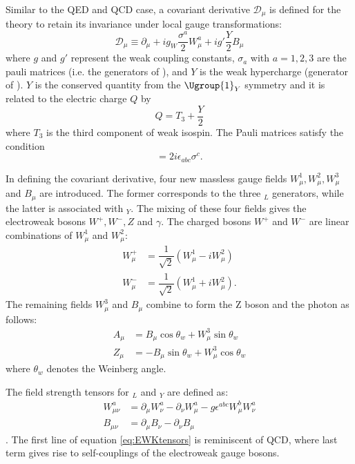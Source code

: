 Similar to the QED and QCD case, a covariant derivative $\mathcal{D}_{\mu}$ is defined for the theory to retain its invariance under local gauge transformations:
\begin{equation}
    \mathcal{D}_{\mu}\equiv \partial_{\mu}+ig_W\dfrac{\sigma^a}{2}W^a_{\mu}+ig'\dfrac{Y}{2}B_{\mu}
\end{equation}
where $g$ and $g'$ represent the weak coupling constants, $\sigma_a$ with $a=1,2,3$ are the pauli matrices (i.e. the generators of ), and $Y$ is the weak hypercharge (generator of ). $Y$ is the conserved quantity from the $\Ugroup{1}_Y$ symmetry and it is related to the electric charge $Q$ by
\begin{equation}
    Q=T_3+\dfrac{Y}{2}
\end{equation}
where $T_3$ is the third component of weak isospin.
The Pauli matrices satisfy the condition
\begin{equation}
    [\sigma_a,\sigma_b]=2i\epsilon_{abc}\sigma^c.
\end{equation}

In defining the covariant derivative, four new massless gauge fields $W^1_{\mu}, W^2_{\mu}, W^3_{\mu}$ and $B_{\mu}$ are introduced. The former corresponds to the three $_L$ generators, while the latter is associated with $_Y$. The mixing of these four fields gives the electroweak bosons $W^+,W^-,Z$ and $\gamma$. The charged bosons $W^+$ and $W^-$ are linear combinations of $W^1_{\mu}$ and $W^2_{\mu}$:
\begin{align}
    W^+_{\mu} & =\dfrac{1}{\sqrt{2}}(W_{\mu}^1-iW_{\mu}^2)\\
    W^-_{\mu} & =\dfrac{1}{\sqrt{2}}(W_{\mu}^1+iW_{\mu}^2).
\end{align}
The remaining fields $W_{\mu}^3$ and $B_{\mu}$ combine to form the Z boson and the photon as follows:
\begin{align}
    A_{\mu} & =B_{\mu}\cos\theta_{w}+W^3_{\mu}\sin\theta_w\\
    Z_{\mu} & =-B_{\mu}\sin\theta_{w}+W^3_{\mu}\cos\theta_w
\end{align}
where $\theta_w$ denotes the Weinberg angle.

The field strength tensors for $_L$ and $_Y$ are defined as: 
\begin{align} \label{eq:EWKtensors}
    W^a_{\mu\nu} & =\partial_{\mu}W^a_{\nu}-\partial_{\nu}W^a_{\mu}-g\epsilon^{abc}W^b_{\mu}W^a_{\nu}\\
    B_{\mu\nu} & =\partial_{\mu}B_{\nu}-\partial_{\nu}B_{\mu}
\end{align}.
The first line of equation \ref{eq:EWKtensors} is reminiscent of QCD, where last term gives rise to self-couplings of the electroweak gauge bosons. 

